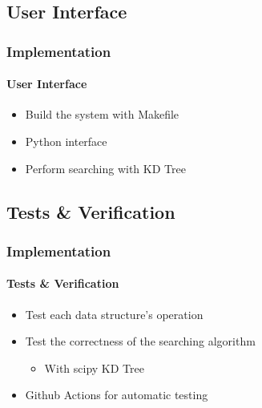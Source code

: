 \documentclass[
	12pt, %
	aspectratio=169, %
]{beamer}
\begin{document}

\subsection{User Interface}

\begin{frame}
	\frametitle{Implementation}
	\framesubtitle{User Interface}

	\begin{itemize}
		\item Build the system with Makefile
		\item Python interface
		\item Perform searching with KD Tree
	\end{itemize}
\end{frame}


\subsection{Tests \& Verification}

\begin{frame}
	\frametitle{Implementation}
	\framesubtitle{Tests \& Verification}

	\begin{itemize}
		\item Test each data structure's operation
		\item Test the correctness of the searching algorithm
		\begin{itemize}
			\item With scipy KD Tree
		\end{itemize}
		\item Github Actions for automatic testing
	\end{itemize}
\end{frame}
\end{document}
